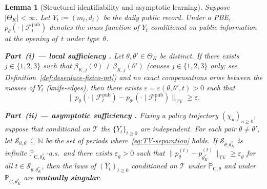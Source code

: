 \documentclass[12pt]{article}
\numberwithin{equation}{section}
\numberwithin{table}{section}
\newtheorem{lemma}[theorem]{Lemma}
\theoremstyle{definition}
\newcommand{\ProbC}[1]{\mathbb{P}_{\mathrm{C},#1}}
\begin{document}
\bigskip

\begin{lemma}[Structural identifiability and asymptotic learning]
\label{lem:hazard-separation}
Suppose $|\Theta_K|<\infty$. Let $Y_t:=(m_t,d_t)$ be the daily public record.
Under a PBE, $p_\theta(\cdot\mid\mathcal{F}_t^{\mathrm{pub}})$ denotes the
mass function of $Y_t$ conditioned on public information at the opening of~$t$
under type~$\theta$.

\smallskip
\noindent\textbf{Part~(i) --- local sufficiency
\citep{Cox1972,Bradburn2003}.}
Let $\theta,\theta'\in\Theta_K$ be distinct. If there exists $j\in\{1,2,3\}$ such that
$\beta_{K,j}(\theta)\neq\beta_{K,j}(\theta')$ (causes $j\in\{1,2,3\}$ only; see
Definition~\ref{def:desenlace-fisico-mt}) and no exact compensations arise
between the masses of $Y_t$ (\emph{knife-edges}),
then there exists $\varepsilon=\varepsilon(\theta,\theta',t)>0$ such that
\begin{equation}
\label{eq:TV-separation}
\bigl\|p_\theta(\cdot\mid\mathcal{F}_t^{\mathrm{pub}})
-p_{\theta'}(\cdot\mid\mathcal{F}_{t}^{\mathrm{pub}})\bigr\|_{\mathrm{TV}}
\ge\varepsilon.
\end{equation}

\smallskip
\noindent\textbf{Part~(ii) --- asymptotic sufficiency
\citep{Kakutani1948,Shiryaev2019Probability}.}
Fixing a policy trajectory $(\chi_u)_{u\ge 0}$, suppose that
conditional on $\mathcal{T}$ the $\{Y_t\}_{t\ge 0}$ are independent. For
each pair $\theta\neq\theta'$, let $\mathcal{S}_{\theta,\theta'}\subseteq\mathbb{N}$
be the set of periods where~\eqref{eq:TV-separation} holds. If
$\mathcal{S}_{\theta,\theta_K^\ast}$ is infinite $\ProbC{\theta_K^\ast}$-a.s.\
and there exists $\underline\varepsilon_\theta>0$ such that
$\|p_\theta^{(t)}-p_{\theta_K^\ast}^{(t)}\|_{\mathrm{TV}}
\ge\underline\varepsilon_\theta$ for all $t\in\mathcal{S}_{\theta,\theta_K^\ast}$,
then the laws of $(Y_t)_{t\ge 0}$ conditioned on $\mathcal{T}$ under
$\ProbC{\theta}$ and under $\ProbC{\theta_K^\ast}$ are
\textbf{mutually singular}.
\end{lemma}
\end{document}
